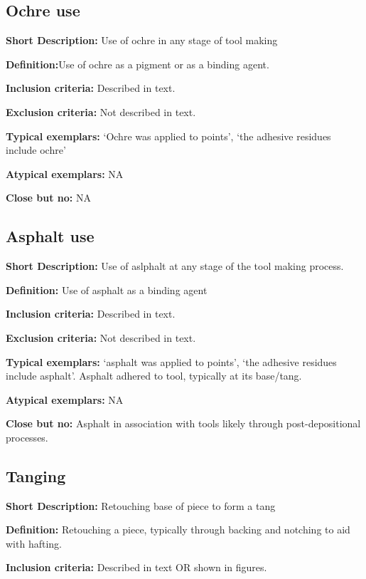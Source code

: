 \documentclass[
]{article}
\begin{document}
\hypertarget{ochre-use}{%
\subsection{Ochre use}\label{ochre-use}}

\textbf{Short Description:} Use of ochre in any stage of tool making

\textbf{Definition:}Use of ochre as a pigment or as a binding agent.

\textbf{Inclusion criteria:} Described in text.

\textbf{Exclusion criteria:} Not described in text.

\textbf{Typical exemplars:} `Ochre was applied to points', `the adhesive
residues include ochre'

\textbf{Atypical exemplars:} NA

\textbf{Close but no:} NA

\hypertarget{asphalt-use}{%
\subsection{Asphalt use}\label{asphalt-use}}

\textbf{Short Description:} Use of aslphalt at any stage of the tool
making process.

\textbf{Definition:} Use of asphalt as a binding agent

\textbf{Inclusion criteria:} Described in text.

\textbf{Exclusion criteria:} Not described in text.

\textbf{Typical exemplars:} `asphalt was applied to points', `the
adhesive residues include asphalt'. Asphalt adhered to tool, typically
at its base/tang.

\textbf{Atypical exemplars:} NA

\textbf{Close but no:} Asphalt in association with tools likely through
post-depositional processes.

\hypertarget{tanging}{%
\subsection{Tanging}\label{tanging}}

\textbf{Short Description:} Retouching base of piece to form a tang

\textbf{Definition:} Retouching a piece, typically through backing and
notching to aid with hafting.

\textbf{Inclusion criteria:} Described in text OR shown in figures.
\end{document}
